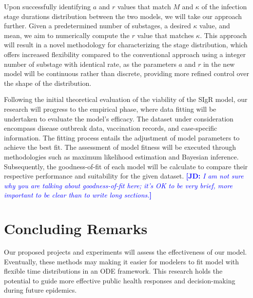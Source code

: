 \documentclass[12pt]{article}
\newcommand{\comment}{}
\renewcommand{\comment}{\nocomment}
\renewcommand{\comment}{\showcomment}
\newcommand{\showcomment}[3]{\textcolor{#1}{\textbf{[#2: }\textsl{#3}\textbf{]}}}
\newcommand{\nocomment}[3]{}
\newcommand{\jd}[1]{\comment{blue}{JD}{#1}}
\begin{document}
Upon successfully identifying $a$ and $r$ values that match $M$ and $\kappa$ of the infection stage durations distribution between the two models, we will take our approach further. Given a predetermined number of substages, a desired $\kappa$ value, and mean, we aim to numerically compute the $r$ value that matches $\kappa$. This approach will result in a novel methodology for characterizing the stage distribution, which offers increased flexibility compared to the conventional approach using a integer number of substage with identical rate, as the parameters $a$ and $r$ in the new model will be continuous rather than discrete, providing more refined control over the shape of the distribution.

Following the initial theoretical evaluation of the viability of the SIgR model, our research will progress to the empirical phase, where data fitting will be undertaken to evaluate the model's efficacy. The dataset under consideration encompass disease outbreak data, vaccination records, and case-specific information. The fitting process entails the adjustment of model parameters to achieve the best fit. The assessment of model fitness will be executed through methodologies such as maximum likelihood estimation and Bayesian inference. Subsequently, the goodness-of-fit of each model will be calculate to compare their respective performance and suitability for the given dataset.
\jd{I am not sure why you are talking about goodness-of-fit here; it's OK to be very brief, more important to be clear than to write long sections.}

\section*{Concluding Remarks}
Our proposed projects and experiments will assess the effectiveness of our model. Eventually, these methods may making it easier for modelers to fit model with flexible time distributions in an ODE framework. This research holds the potential to guide more effective public health responses and decision-making during future epidemics.


 
\end{document}

